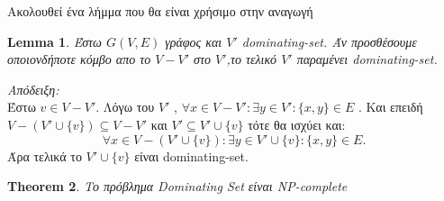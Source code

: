 \documentclass{article}
\newtheorem{theorem}{Theorem}
\newtheorem{lemma}[theorem]{Lemma}
\begin{document}
Ακολουθεί ένα λήμμα που θα είναι χρήσιμο στην αναγωγή
\begin{lemma}
\label{DSk_subset_Dsk+1}
	Έστω $G(V,E)$ γράφος και $V'$ dominating-set. Άν προσθέσουμε οποιονδήποτε κόμβο απο το $V-V'$ στο $V'$,το τελικό
	$V'$ παραμένει dominating-set.
\end{lemma}
\textit{Απόδειξη:}\\
	Έστω $v \in V - V'$. Λόγω του $V'$ , $\forall x \in V - V' : \exists y \in V' : \{x,y\} \in E$ .
	Και επειδή $V - (V' \cup \{v\}) \subseteq V-V'$ και $V' \subseteq V' \cup\{v\}$ τότε θα ισχύει και:
	$$
		\forall x \in V-(V' \cup \{v\}) : \exists y \in  V' \cup \{v\} : \{x,y\} \in E .
	$$
	Άρα τελικά το $V' \cup \{v\}$ είναι dominating-set.
\begin{theorem}
Το πρόβλημα Dominating Set είναι NP-complete\\
\end{theorem}
\end{document}
